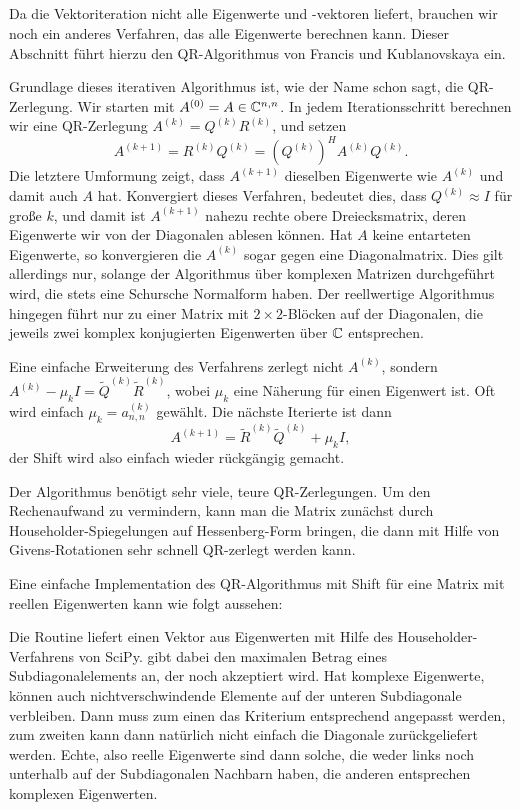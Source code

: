 \subsection{}

Da die Vektoriteration nicht alle Eigenwerte und -vektoren liefert,
brauchen wir noch ein anderes Verfahren, das alle Eigenwerte berechnen
kann. Dieser Abschnitt führt hierzu den QR-Algorithmus von Francis und
Kublanovskaya ein.

Grundlage dieses iterativen Algorithmus ist, wie der Name schon sagt,
die QR-Zerlegung. Wir starten mit $A^{(0)} = A\in\mathbb{C}^{n,n}$. In jedem
Iterationsschritt berechnen wir eine QR-Zerlegung
$A^{(k)}=Q^{(k)}R^{(k)}$, und setzen
\begin{equation}
  A^{(k+1)} = R^{(k)}Q^{(k)} = \left(Q^{(k)}\right)^HA^{(k)}Q^{(k)}.
\end{equation}
Die letztere Umformung zeigt, dass $A^{(k+1)}$ dieselben Eigenwerte wie
$A^{(k)}$ und damit auch $A$ hat. Konvergiert dieses Verfahren,
bedeutet dies, dass $Q^{(k)}\approx I$ für große $k$, und damit ist
$A^{(k+1)}$ nahezu rechte obere Dreiecksmatrix, deren Eigenwerte wir
von der Diagonalen ablesen können. Hat $A$ keine entarteten
Eigenwerte, so konvergieren die $A^{(k)}$ sogar gegen eine
Diagonalmatrix. Dies gilt allerdings nur, solange der Algorithmus über
komplexen Matrizen durchgeführt wird, die stets eine Schursche
Normalform haben. Der reellwertige Algorithmus hingegen führt nur zu
einer Matrix mit $2\times 2$-Blöcken auf der Diagonalen, die jeweils
zwei komplex konjugierten Eigenwerten über $\mathbb{C}$ entsprechen.

Eine einfache Erweiterung des Verfahrens zerlegt nicht $A^{(k)}$,
sondern $A^{(k)} - \mu_kI = \tilde{Q}^{(k)}\tilde{R}^{(k)}$, wobei $\mu_k$ eine
Näherung für einen Eigenwert ist. Oft wird einfach $\mu_k = a^{(k)}_{n,n}$
gewählt. Die nächste Iterierte ist dann
\begin{equation}
  A^{(k+1)} = \tilde{R}^{(k)}\tilde{Q}^{(k)} + \mu_kI,
\end{equation}
der Shift wird also einfach wieder rückgängig gemacht.

Der Algorithmus benötigt sehr viele, teure QR-Zerlegungen. Um den
Rechenaufwand zu vermindern, kann man die Matrix zunächst durch
Householder-Spiegelungen auf Hessenberg-Form bringen, die dann mit
Hilfe von Givens-Rotationen sehr schnell QR-zerlegt werden kann.

Eine einfache Implementation des QR-Algorithmus mit Shift für eine
Matrix mit reellen Eigenwerten kann wie folgt aussehen:

Die Routine liefert einen Vektor aus Eigenwerten mit Hilfe des
Householder-Verfahrens von SciPy.  gibt dabei den
maximalen Betrag eines Subdiagonalelements an, der noch akzeptiert
wird.  Hat  komplexe Eigenwerte, können auch nichtverschwindende
Elemente auf der unteren Subdiagonale verbleiben. Dann muss zum einen
das Kriterium entsprechend angepasst werden, zum zweiten
kann dann natürlich nicht einfach die Diagonale zurückgeliefert
werden. Echte, also reelle Eigenwerte sind dann solche, die weder
links noch unterhalb auf der Subdiagonalen Nachbarn haben, die anderen
entsprechen komplexen Eigenwerten.

